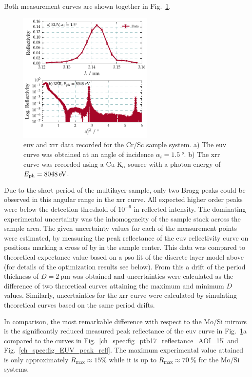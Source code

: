 Both measurement curves are shown together in Fig.~\ref{ch_spec:fig_CrSc_EUV_XRR_data}.
\begin{figure}[htbp]
  \centering
  \includegraphics[width=0.6\textwidth]{img/CrSc_EUV_XRR_data}
  \caption[EUV and XRR data recorded for the Cr/Sc sample system.]{\Gls{euv} and \gls{xrr} data recorded for the Cr/Sc sample system. a) The \gls{euv} curve was obtained at an angle of incidence $\alpha_i=\SI{1.5}{\degree}$. b) The \gls{xrr} curve was recorded using a Cu-K$_\alpha$ source with a photon energy of $E_\text{ph}=\ev{8048}$.}
  \label{ch_spec:fig_CrSc_EUV_XRR_data}
\end{figure}
Due to the short period of the multilayer sample, only two Bragg peaks could be observed in this angular range in the \gls{xrr} curve. All expected higher order peaks were below the detection threshold of $10^{-6}$ in reflected intensity. The dominating experimental uncertainty was the inhomogeneity of the sample stack across the sample area. The given uncertainty values for each of the measurement points were estimated, by measuring the peak reflectance of the \gls{euv} reflectivity curve on positions marking a cross of  by  in the sample center. This data was compared to theoretical expectance value based on a \gls{pso} fit of the discrete layer model above (for details of the optimization results see below). From this a drift of the period thickness of $D=\SI{2}{\pico\meter}$ was obtained and uncertainties were calculated as the difference of two theoretical curves attaining the maximum and minimum $D$ values. Similarly, uncertainties for the \gls{xrr} curve were calculated by simulating theoretical curves based on the same period drifts.

In comparison, the most remarkable difference with respect to the Mo/Si mirrors is the significantly reduced measured peak reflectance of the \gls{euv} curve in Fig.~\ref{ch_spec:fig_CrSc_EUV_XRR_data}a compared to the curves in Fig.~\ref{ch_spec:fig_ptb17_reflectance_AOI_15} and Fig.~\ref{ch_spec:fig_EUV_peak_refl}. The maximum experimental value attained is only approximately $R_\text{max} \approx 15\%$ while it is up to $R_\text{max} \approx \SI{70}{\percent}$ for the Mo/Si systems.


